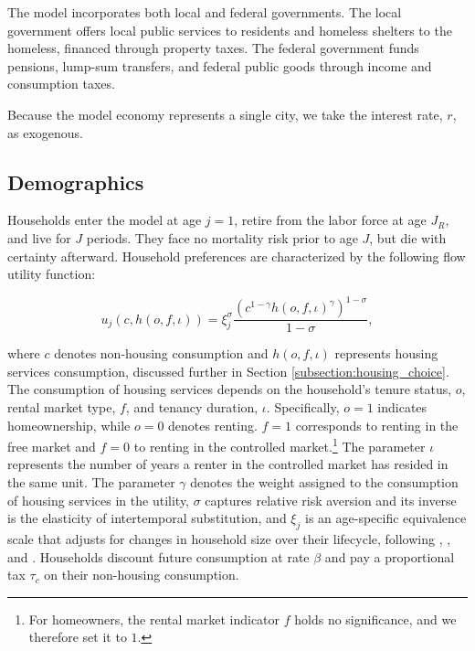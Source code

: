 \documentclass[parskip=full]{article}
\begin{document}
The model incorporates both local and federal governments. The local government offers local public services to residents and homeless shelters to the homeless, financed through property taxes. The federal government funds pensions, lump-sum transfers, and federal public goods through income and consumption taxes.

Because the model economy represents a single city, we take the interest rate, $r$, as exogenous. 

\subsection{Demographics}\label{subsection:demographics}

Households enter the model at age $j=1$, retire from the labor force at age $J_{R}$, and live for $J$ periods. They face no mortality risk prior to age $J$, but die with certainty afterward. Household preferences are characterized by the following flow utility function:

\begin{equation*}
    u_{j}(c,h(o,f,\iota))=\xi_{j}^{\sigma}\frac{\left(c^{1-\gamma} h(o,f,\iota)^{\gamma}\right)^{1-\sigma}}{1-\sigma},
\end{equation*}

\noindent where $c$ denotes non-housing consumption and $h(o,f,\iota)$ represents housing services consumption, discussed further in Section \ref{subsection:housing_choice}. The consumption of housing services depends on the household's tenure status, $o$, rental market type, $f$, and tenancy duration, $\iota$. Specifically, $o=1$ indicates homeownership, while $o=0$ denotes renting. $f=1$ corresponds to renting in the free market and $f=0$ to renting in the controlled market.\footnote{For homeowners, the rental market indicator $f$ holds no significance, and we therefore set it to $1$.} The parameter $\iota$ represents the number of years a renter in the controlled market has resided in the same unit. The parameter $\gamma$ denotes the weight assigned to the consumption of housing services in the utility, $\sigma$ captures relative risk aversion and its inverse is the elasticity of intertemporal substitution, and $\xi_{j}$ is an age-specific equivalence scale that adjusts for changes in household size over their lifecycle, following \citet{lm-1980}, \citet{wz-2010}, and \citet{xu-2013}. Households discount future consumption at rate $\beta$ and pay a proportional tax $\tau_{c}$ on their non-housing consumption.
\end{document}

